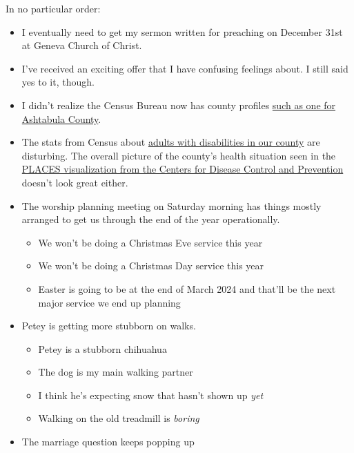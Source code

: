In no particular order:

\begin{itemize}
\tightlist
\item
  I eventually need to get my sermon written for preaching on December
  31st at Geneva Church of Christ.
\item
  I've received an exciting offer that I have confusing feelings about.
  I still said yes to it, though.
\item
  I didn't realize the Census Bureau now has county profiles
  \href{https://data.census.gov/profile/Ashtabula_County,_Ohio?g=050XX00US39007}{such
  as one for Ashtabula County}.
\item
  The stats from Census about
  \href{https://data.census.gov/vizwidget?g=050XX00US39007&infoSection=Disability}{adults
  with disabilities in our county} are disturbing. The overall picture
  of the county's health situation seen in the
  \href{https://www.cdc.gov/places/about/index.html}{PLACES
  visualization from the Centers for Disease Control and Prevention}
  doesn't look great either.
\item
  The worship planning meeting on Saturday morning has things mostly
  arranged to get us through the end of the year operationally.

  \begin{itemize}
  \tightlist
  \item
    We won't be doing a Christmas Eve service this year
  \item
    We won't be doing a Christmas Day service this year
  \item
    Easter is going to be at the end of March 2024 and that'll be the
    next major service we end up planning
  \end{itemize}
\item
  Petey is getting more stubborn on walks.

  \begin{itemize}
  \tightlist
  \item
    Petey is a stubborn chihuahua
  \item
    The dog is my main walking partner
  \item
    I think he's expecting snow that hasn't shown up \emph{yet}\\
  \item
    Walking on the old treadmill is \emph{boring}
  \end{itemize}
\item
  The marriage question keeps popping up


\end{itemize}
